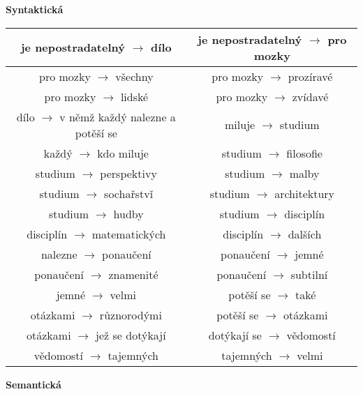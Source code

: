 \documentclass[12pt,a4paper]{article}
\theoremstyle{definition}
\begin{document}
\clearpage
\textbf{Syntaktick\'{a}} \\
\begin{tabular}{|c||c|}
\hline
je nepostradateln\'{y} $ \rightarrow $ d\'{i}lo & je nepostradateln\'{y} $ \rightarrow $ pro mozky \\
\hline
pro mozky $ \rightarrow $ v\v{s}echny  & pro mozky $ \rightarrow $ proz\'{i}rav\'{e}  \\
\hline
pro mozky $ \rightarrow $ lidsk\'{e}  & pro mozky $ \rightarrow $ zv\'{i}dav\'{e}   \\
\hline
d\'{i}lo $ \rightarrow $ v n\v{e}m\v{z} ka\v{z}d\'{y} nalezne a pot\v{e}\v{s}\'{i} se & miluje $ \rightarrow $ studium \\
\hline
ka\v{z}d\'{y} $ \rightarrow $ kdo miluje & studium $ \rightarrow $ filosofie \\
\hline
studium $ \rightarrow $ perspektivy & studium $ \rightarrow $ malby \\
\hline
studium $ \rightarrow $ socha\v{r}stv\v{i} & studium $ \rightarrow $ architektury \\
\hline
studium $ \rightarrow $ hudby & studium $ \rightarrow $ discipl\'{i}n \\
\hline
discipl\'{i}n $\rightarrow $ matematick\'{y}ch  & discipl\'{i}n $\rightarrow $ dal\v{s}\'{i}ch \\
\hline
nalezne $\rightarrow $ ponau\v{c}en\'{i} & ponau\v{c}en\'{i} $\rightarrow $ jemn\'{e} \\
\hline
ponau\v{c}en\'{i} $\rightarrow $ znamenit\'{e} & ponau\v{c}en\'{i} $\rightarrow $ subtiln\'{i} \\
\hline
jemn\'{e} $ \rightarrow $ velmi & pot\v{e}\v{s}\'{i} se $ \rightarrow $ tak\'{e} \\
\hline
ot\'{a}zkami $ \rightarrow $ r\r{u}znorod\'{y}mi & pot\v{e}\v{s}\'{i} se $\rightarrow $ ot\'{a}zkami \\ 
\hline
ot\'{a}zkami $ \rightarrow $ je\v{z} se dot\'{y}kaj\'{i} & dot\'{y}kaj\'{i} se $\rightarrow $ v\v{e}domost\'{i} \\
\hline
v\v{e}domost\'{i} $ \rightarrow $ tajemn\'{y}ch & tajemn\'{y}ch $\rightarrow $  velmi \\
\hline
\hline
\end{tabular}
\textbf{Semantick\'{a}} \\
\end{document}
